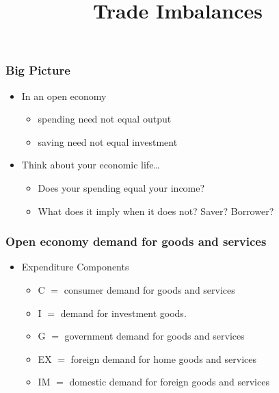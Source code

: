 \documentclass[handout]{beamer}
\title[NYU Stern] %
{\Large \Large Trade Imbalances}
\author[Michael Waugh] %
{\bf{\Large}}%
\date[] %
\begin{document}
\begin{frame}
  \titlepage
\end{frame}

\begin{frame}[t]
\frametitle{Big Picture}
\bigskip
\begin{itemize}
\item In an open economy
\begin{itemize}
\medskip
\item spending need not equal output
\medskip
\item saving need not equal investment
\end{itemize}
\bigskip
\item Think about your economic life\ldots
\begin{itemize}
\medskip
\item Does your spending equal your income?
\medskip
\item What does it imply when it does not? Saver? Borrower?
\end{itemize}
\end{itemize}
\bigskip
\end{frame}


\begin{frame}[t]
\frametitle{Open economy demand for goods and services}
\begin{itemize}
\item Expenditure Components
\begin{itemize}
\medskip
\item C $=$ consumer demand for goods and services
\medskip
\item I $=$ demand for investment goods.
\medskip
\item G $=$ government demand for goods and services
\medskip
\item EX $=$ foreign demand for home goods and services
\medskip
\item IM $=$ domestic demand for foreign goods and services
\end{itemize}
\end{itemize}
\bigskip
\end{frame}

\end{document}
